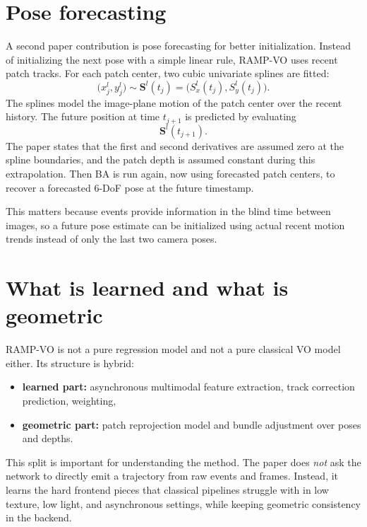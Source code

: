 \documentclass[11pt]{article}
\begin{document}
\section{Pose forecasting}

A second paper contribution is pose forecasting for better initialization.
Instead of initializing the next pose with a simple linear rule, RAMP-VO uses recent patch tracks.
For each patch center, two cubic univariate splines are fitted:
\begin{equation}
\big(x_j^l,y_j^l\big) \sim \mathbf{S}^l(t_j) = \big(S_x^l(t_j), S_y^l(t_j)\big).
\end{equation}
The splines model the image-plane motion of the patch center over the recent history.
The future position at time \(t_{j+1}\) is predicted by evaluating
\begin{equation}
\mathbf{S}^l(t_{j+1}).
\end{equation}
The paper states that the first and second derivatives are assumed zero at the spline boundaries, and the patch depth is assumed constant during this extrapolation.
Then BA is run again, now using forecasted patch centers, to recover a forecasted 6-DoF pose at the future timestamp.

This matters because events provide information in the blind time between images, so a future pose estimate can be initialized using actual recent motion trends instead of only the last two camera poses.

\section{What is learned and what is geometric}

RAMP-VO is not a pure regression model and not a pure classical VO model either.
Its structure is hybrid:
\begin{itemize}
    \item \textbf{learned part:} asynchronous multimodal feature extraction, track correction prediction, weighting,
    \item \textbf{geometric part:} patch reprojection model and bundle adjustment over poses and depths.
\end{itemize}
This split is important for understanding the method.
The paper does \emph{not} ask the network to directly emit a trajectory from raw events and frames.
Instead, it learns the hard frontend pieces that classical pipelines struggle with in low texture, low light, and asynchronous settings, while keeping geometric consistency in the backend.
\end{document}
